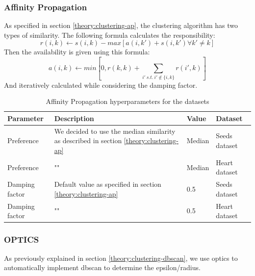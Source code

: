 \subsubsection{Affinity Propagation}
As specified in section \ref{theory:clustering-ap}, the clustering algorithm has two types of similarity.
The following formula calculates the responsibility:
\begin{equation}
  r(i, k) \leftarrow s(i, k) - max [ a(i, k') + s(i, k') \forall k' \neq k ]
\end{equation}
Then the availability is given using this formula:
\begin{equation}
  a(i, k) \leftarrow min [0, r(k, k) + \sum_{i'~s.t.~i' \notin \{i, k\}}{r(i', k)}]
\end{equation}
And iteratively calculated while considering the damping factor.
\begin{table}[h]
  \begin{tabular}{|l|p{6cm}|l|l|}
    \hline
    Parameter      & Description                                                                                & Value  & Dataset       \\
    \hline
    Preference     & We decided to use the median similarity as described in section \ref{theory:clustering-ap} & Median & Seeds dataset \\
    \hline
    Preference     & ""                                                                                         & Median & Heart dataset \\
    \hline

    Damping factor & Default value as specified in section \ref{theory:clustering-ap}                           & 0.5    & Seeds dataset \\
    \hline
    Damping factor & ""                                                                                         & 0.5    & Heart dataset \\
    \hline
  \end{tabular}
  \caption{Affinity Propagation hyperparameters for the datasets}
  \label{tab:ap-formula-sklearn}
\end{table}
\newpage
\subsubsection{OPTICS}
As previously explained in section \ref{theory:clustering-dbscan}, we use \gls{optics} to automatically implement \gls{dbscan} to determine the epsilon/radius.

